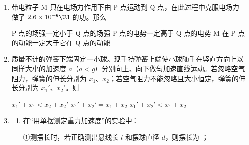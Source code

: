 \documentclass[\gkver]{gaokaozhenti}
\begin{document}
\begin{enumerate}

\item
带电粒子 M 只在电场力作用下由 P 点运动到 Q 点，在此过程中克服电场力做了 $2.6\times10^{-6}\UJ$ 的功。那么

{P 点的场强一定小于 Q 点的场强}
{P 点的电势一定高于 Q 点的电势}
{M 在 P 点的动能一定大于它在 Q 点的动能}


\item
质量不计的弹簧下端固定一小球。现手持弹簧上端使小球随手在竖直方向上以同样大小的加速度 $a$（$a < g$）分别向上、向下做匀加速直线运动。若忽略空气阻力，弹簧的伸长分别为 $x_{1}$、$x_{2}$；若空气阻力不能忽略且大小恒定，弹簧的伸长分别为 $x_{1}'$、$x_{2}'$。则

{$x_{1}' + x_{1} < x_{2} + x_{2}'$}
{$x_{1}' + x_{2}' = x_{1} + x_{2}$}
{$x_{1}' + x_{2}' < x_{1} + x_{2}$}


\item
\begin{enumerate}
	\item
	在“用单摆测定重力加速度”的实验中：

	①测摆长时，若正确测出悬线长 $l$ 和摆球直径 $d$，则摆长为 ；


\end{enumerate}
\end{enumerate}
\end{document}
